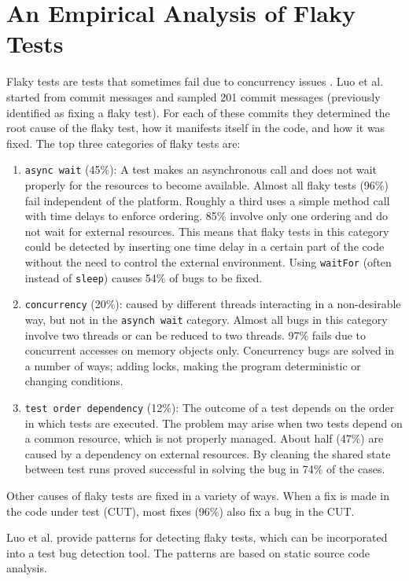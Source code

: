 \documentclass{uvamscse}
\newcommand{\Aflaky}{Luo et al.}
\begin{document}
\section{An Empirical Analysis of Flaky Tests}
Flaky tests are tests that sometimes fail due to concurrency issues \cite{luo2014empirical}. \Aflaky{} started from commit messages and sampled 201 commit messages (previously identified as fixing a flaky test). For each of these commits they determined the root cause of the flaky test, how it manifests itself in the code, and how it was fixed. The top three categories of flaky tests are:
\begin{enumerate}
	\item \texttt{async wait} (45\%): A test makes an asynchronous call and does not wait properly for the resources to become available. Almost all flaky tests (96\%) fail independent of the platform. Roughly a third uses a simple method call with time delays to enforce ordering. 85\% involve only one ordering and do not wait for external resources. This means that flaky tests in this category could be detected by inserting one time delay in a certain part of the code without the need to control the external environment. Using \texttt{waitFor} (often instead of \texttt{sleep}) causes 54\% of bugs to be fixed. 
	\item \texttt{concurrency} (20\%): caused by different threads interacting in a non-desirable way, but not in the \texttt{asynch wait} category. Almost all bugs in this category involve two threads or can be reduced to two threads. 97\% fails due to concurrent accesses on memory objects only. Concurrency bugs are solved in a number of ways; adding locks, making the program deterministic or changing conditions. 
	\item \texttt{test order dependency} (12\%): The outcome of a test depends on the order in which tests are executed. The problem may arise when two tests depend on a common resource, which is not properly managed. About half (47\%) are caused by a dependency on external resources. By cleaning the shared state between test runs proved successful in solving the bug in 74\% of the cases. 
\end{enumerate}
Other causes of flaky tests are fixed in a variety of ways. When a fix is made in the code under test (CUT), most fixes (96\%) also fix a bug in the CUT.

\Aflaky{} provide patterns for detecting flaky tests, which can be incorporated into a test bug detection tool. The patterns are based on static source code analysis.
\end{document}

